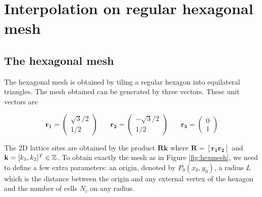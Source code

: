 \documentclass[proc]{edpsmath}
\begin{document}
\section{Interpolation on regular hexagonal mesh}
\label{sec:interpolation}
\subsection{The hexagonal mesh}

The hexagonal mesh is obtained by tiling a regular hexagon into equilateral triangles. The mesh obtained can be generated by three vectors. These unit vectors are

\begin{equation}
	\mathbf{r_1} = \begin{pmatrix}\sqrt{3}/2 \\  1/2
		\end{pmatrix} ~~~~~~~~
	\mathbf{r_2} = \begin{pmatrix}-\sqrt{3}/2 \\ 1/2
		\end{pmatrix} ~~~~~~~~
	\mathbf{r_3} = \begin{pmatrix} 0 \\ 1
		\end{pmatrix}
\end{equation}

The 2D lattice sites are obtained by the product $\mathbf{Rk}$ where $\mathbf{R} = [\mathbf{r_1 r_2}]$ and $\mathbf{k} = [k_1, k_2]^T \in \mathbb{Z}$.  To obtain exactly the mesh as in Figure \ref{fig:hexmesh}, we need to define a few extra parameters: an origin, denoted by $P_0(x_0, y_0)$, a radius $L$ which is the distance between the origin and any external vertex of the hexagon and the number of cells $N_c$ on any radius.
\end{document}
